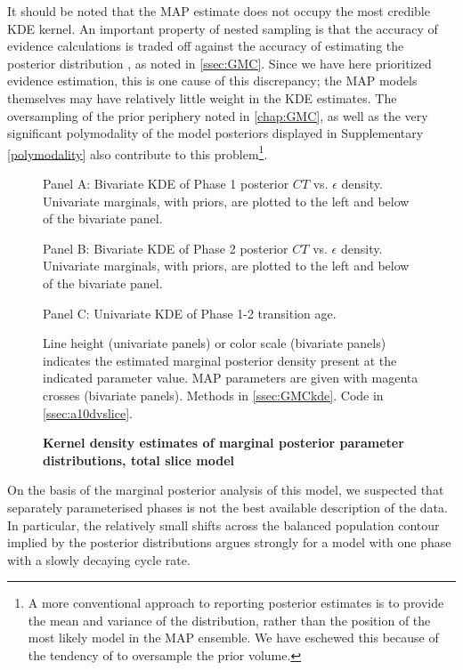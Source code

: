 It should be noted that the MAP estimate does not occupy the most credible KDE kernel. An important property of nested sampling is that the accuracy of evidence calculations is traded off against the accuracy of estimating the posterior distribution \cite{Speagle2019}, as noted in \autoref{ssec:GMC}. Since we have here prioritized evidence estimation, this is one cause of this discrepancy; the MAP models themselves may have relatively little weight in the KDE estimates. The oversampling of the prior periphery noted in \autoref{chap:GMC}, as well as the very significant polymodality of the model posteriors displayed in Supplementary \autoref{polymodality} also contribute to this problem\footnote{A more conventional approach to reporting posterior estimates is to provide the mean and variance of the distribution, rather than the position of the most likely model in the MAP ensemble. We have eschewed this because of the tendency of  to oversample the prior volume.}.

\begin{figure}[!h]
    \caption{{\bf Kernel density estimates of marginal posterior parameter distributions, total slice model}}
    Panel A: Bivariate KDE of Phase 1 posterior $CT$ vs. $\epsilon$ density. Univariate marginals, with priors, are plotted to the left and below of the bivariate panel.

    Panel B: Bivariate KDE of Phase 2 posterior $CT$ vs. $\epsilon$ density. Univariate marginals, with priors, are plotted to the left and below of the bivariate panel.

    Panel C: Univariate KDE of Phase 1-2 transition age.

    Line height (univariate panels) or color scale (bivariate panels) indicates the estimated marginal posterior density present at the indicated parameter value. MAP parameters are given with magenta crosses (bivariate panels).
    \label{dvmarginals}
    Methods in \autoref{ssec:GMCkde}.
    Code in \autoref{ssec:a10dvslice}.    
\end{figure}

On the basis of the marginal posterior analysis of this model, we suspected that separately parameterised phases is not the best available description of the data. In particular, the relatively small shifts across the balanced population contour implied by the posterior distributions argues strongly for a model with one phase with a slowly decaying cycle rate.

